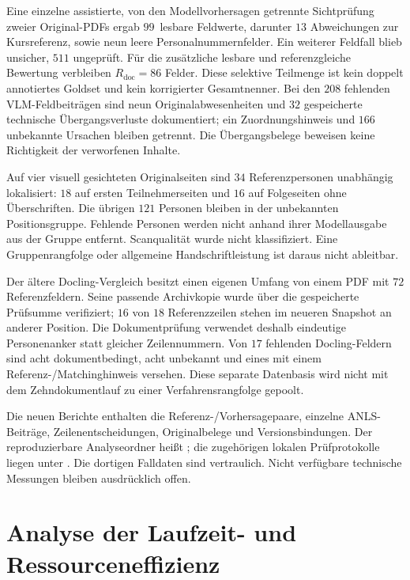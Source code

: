 Eine einzelne assistierte, von den Modellvorhersagen getrennte Sichtprüfung zweier Original-PDFs ergab $99$~lesbare Feldwerte, darunter $13$ Abweichungen zur Kursreferenz, sowie neun leere Personalnummernfelder. Ein weiterer Feldfall blieb unsicher, $511$ ungeprüft. Für die zusätzliche lesbare und referenzgleiche Bewertung verbleiben $R_{\mathrm{doc}}=86$ Felder. Diese selektive Teilmenge ist kein doppelt annotiertes Goldset und kein korrigierter Gesamtnenner. Bei den $208$ fehlenden VLM-Feldbeiträgen sind neun Originalabwesenheiten und $32$ gespeicherte technische Übergangsverluste dokumentiert; ein Zuordnungshinweis und $166$ unbekannte Ursachen bleiben getrennt. Die Übergangsbelege beweisen keine Richtigkeit der verworfenen Inhalte.

Auf vier visuell gesichteten Originalseiten sind $34$ Referenzpersonen unabhängig lokalisiert: $18$ auf ersten Teilnehmerseiten und $16$ auf Folgeseiten ohne Überschriften. Die übrigen $121$ Personen bleiben in der unbekannten Positionsgruppe. Fehlende Personen werden nicht anhand ihrer Modellausgabe aus der Gruppe entfernt. Scanqualität wurde nicht klassifiziert. Eine Gruppenrangfolge oder allgemeine Handschriftleistung ist daraus nicht ableitbar.

Der ältere Docling-Vergleich besitzt einen eigenen Umfang von einem PDF mit $72$ Referenzfeldern. Seine passende Archivkopie wurde über die gespeicherte Prüfsumme verifiziert; $16$ von $18$ Referenzzeilen stehen im neueren Snapshot an anderer Position. Die Dokumentprüfung verwendet deshalb eindeutige Personenanker statt gleicher Zeilennummern. Von $17$ fehlenden Docling-Feldern sind acht dokumentbedingt, acht unbekannt und eines mit einem Referenz-/Matchinghinweis versehen. Diese separate Datenbasis wird nicht mit dem Zehndokumentlauf zu einer Verfahrensrangfolge gepoolt.

Die neuen Berichte enthalten die Referenz-/Vorhersagepaare, einzelne ANLS-Beiträge, Zeilenentscheidungen, Originalbelege und Versionsbindungen. Der reproduzierbare Analyseordner heißt ; die zugehörigen lokalen Prüfprotokolle liegen unter . Die dortigen Falldaten sind vertraulich. Nicht verfügbare technische Messungen bleiben ausdrücklich offen.

\section{Analyse der Laufzeit- und Ressourceneffizienz}
\label{sec:ergebnisse-effizienz}

